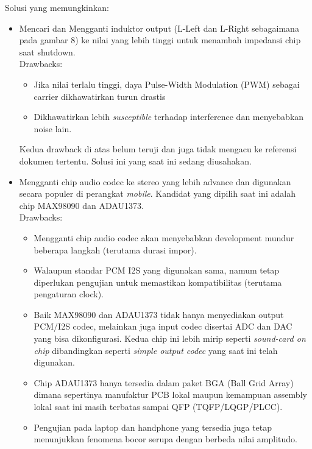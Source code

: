 \documentclass[12pt,]{article}
\begin{document}
	Solusi yang memungkinkan:
	\begin{itemize}
		\item Mencari dan Mengganti induktor output (L-Left dan L-Right sebagaimana pada gambar 8) ke nilai yang lebih tinggi untuk menambah impedansi chip saat shutdown.\\
		Drawbacks:
		\begin{itemize}
			\item Jika nilai terlalu tinggi, daya Pulse-Width Modulation (PWM) sebagai carrier dikhawatirkan turun drastis
			
			\item Dikhawatirkan lebih \textit{susceptible} terhadap interference dan menyebabkan noise lain.
		\end{itemize}
		Kedua drawback di atas belum teruji dan juga tidak mengacu ke referensi dokumen tertentu. Solusi ini yang saat ini sedang diusahakan.
		
		\item Mengganti chip audio codec ke stereo yang lebih advance dan digunakan secara populer di perangkat \textit{mobile}.
		Kandidat yang dipilih saat ini adalah chip MAX98090\cite{max98090} dan ADAU1373\cite{adau1373}.\\
		Drawbacks:
		\begin{itemize}
			\item Mengganti chip audio codec akan menyebabkan development mundur beberapa langkah (terutama durasi impor).
			
			\item Walaupun standar PCM I2S yang digunakan sama, namum tetap diperlukan pengujian untuk memastikan kompatibilitas (terutama pengaturan clock).
			
			\item Baik MAX98090 dan ADAU1373 tidak hanya menyediakan output PCM/I2S codec, melainkan juga input codec disertai ADC dan DAC yang bisa dikonfigurasi.
			Kedua chip ini lebih mirip seperti \textit{sound-card on chip} dibandingkan seperti \textit{simple output codec} yang saat ini telah digunakan.
			
			\item Chip ADAU1373 hanya tersedia dalam paket BGA (Ball Grid Array) dimana sepertinya manufaktur PCB lokal maupun kemampuan assembly lokal saat ini
			masih terbatas sampai QFP (TQFP/LQGP/PLCC).
			
			\item Pengujian pada laptop dan handphone yang tersedia juga tetap menunjukkan fenomena bocor serupa dengan berbeda nilai amplitudo.
		\end{itemize}
		
			
	\end{itemize}
\end{document}
